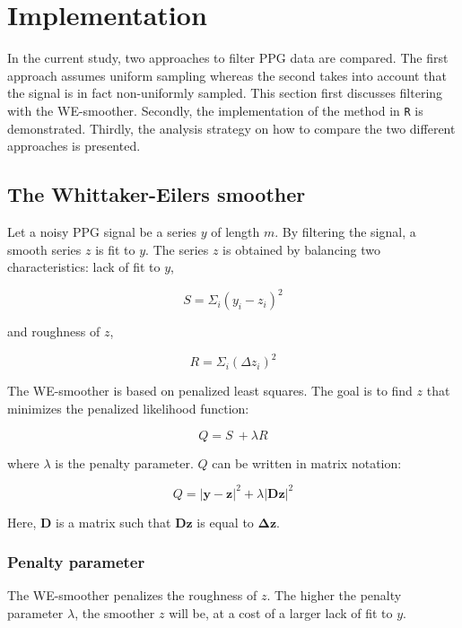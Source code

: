 \documentclass[twocolumn]{bmcart}%
\begin{document}
\section*{Implementation}
In the current study, two approaches to filter PPG data are compared. 
The first approach assumes uniform sampling whereas the second takes into account that the signal is in fact non-uniformly sampled. 
This section first discusses filtering with the WE-smoother.
Secondly, the implementation of the method in \texttt{R} \cite{RCoreTeam2019} is demonstrated.
Thirdly, the analysis strategy on how to compare the two different approaches is presented. 

\subsection*{The Whittaker-Eilers smoother}
Let  a noisy PPG signal be a series $y$ of length $m$. 
By filtering the signal, a smooth series $z$ is fit to $y$.  
The series $z$ is obtained by balancing two characteristics: lack of fit to $y$,

\begin{equation}
    S = \Sigma_i(y_i-z_i)^2
\end{equation}

and roughness of $z$,

\begin{equation}
    R = \Sigma_i(\Delta z_i)^2
\end{equation}

The WE-smoother is based on penalized least squares. The goal is to find $z$ that minimizes the penalized likelihood function: 

\begin{equation}
    Q = S \ + \lambda R
\end{equation}

where $\lambda$ is the penalty parameter. 
$Q$ can be written in matrix notation: 

\begin{equation}
    Q = |\mathbf{y - z}|^2 + \lambda|\mathbf{Dz}|^2
\end{equation}

Here, $\mathbf{D}$ is a matrix such that $\mathbf{Dz}$ is equal to $\mathbf{\Delta z}$.

\subsubsection*{Penalty parameter}
The WE-smoother penalizes the roughness of $z$. 
The higher the penalty parameter $\lambda$, the smoother $z$ will be, at a cost of a larger lack of fit to $y$. 
\end{document}
